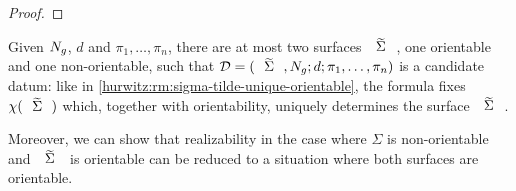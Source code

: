 \begin{proof}
\end{proof}
\egroup

\begin{remark}\label{hurwitz:rm:sigma-tilde-unique-non-orientable}
Given $N_{g}$, $d$ and $\pi_1,\ldots,\pi_n$, there are at most two surfaces $\tSigma$, one orientable and one non-orientable, such that $\DD=\datum{\tSigma,\nosurf{g}}{d}{\pi_1,\ldots,\pi_n}$ is a candidate datum: like in \cref{hurwitz:rm:sigma-tilde-unique-orientable}, the \RH{} formula fixes $\chi(\tSigma)$ which, together with orientability, uniquely determines the surface $\tSigma$.
\end{remark}

Moreover, we can show that realizability in the case where $\Sigma$ is non-orientable and $\tSigma$ is orientable can be reduced to a situation where both surfaces are orientable.


